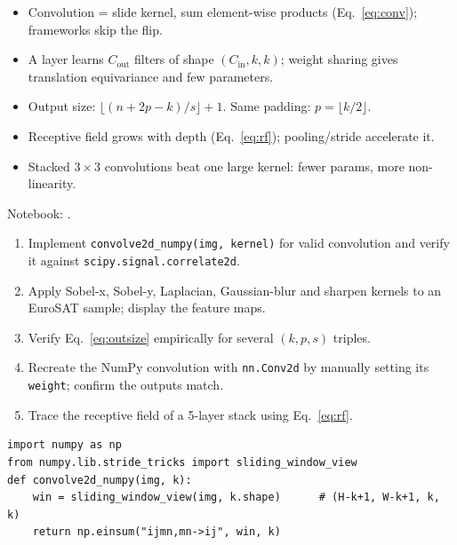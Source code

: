 \begin{keybox}
\begin{itemize}[leftmargin=1.2em,nosep]
  \item Convolution = slide kernel, sum element-wise products (Eq.~\ref{eq:conv}); frameworks skip the flip.
  \item A layer learns $C_\mathrm{out}$ filters of shape $(C_\mathrm{in},k,k)$; weight sharing gives translation equivariance and few parameters.
  \item Output size: $\lfloor(n+2p-k)/s\rfloor+1$. Same padding: $p=\lfloor k/2\rfloor$.
  \item Receptive field grows with depth (Eq.~\ref{eq:rf}); pooling/stride accelerate it.
  \item Stacked $3\times3$ convolutions beat one large kernel: fewer params, more non-linearity.
\end{itemize}
\end{keybox}

\begin{practbox}
Notebook: .
\begin{enumerate}[leftmargin=1.4em,nosep]
  \item Implement \texttt{convolve2d\_numpy(img, kernel)} for valid convolution and
  verify it against \texttt{scipy.signal.correlate2d}.
  \item Apply Sobel-x, Sobel-y, Laplacian, Gaussian-blur and sharpen kernels to an
  EuroSAT sample; display the feature maps.
  \item Verify Eq.~\eqref{eq:outsize} empirically for several $(k,p,s)$ triples.
  \item Recreate the NumPy convolution with \texttt{nn.Conv2d} by manually setting
  its \texttt{weight}; confirm the outputs match.
  \item Trace the receptive field of a 5-layer stack using Eq.~\eqref{eq:rf}.
\end{enumerate}
\begin{lstlisting}
import numpy as np
from numpy.lib.stride_tricks import sliding_window_view
def convolve2d_numpy(img, k):
    win = sliding_window_view(img, k.shape)      # (H-k+1, W-k+1, k, k)
    return np.einsum("ijmn,mn->ij", win, k)
\end{lstlisting}
\end{practbox}

